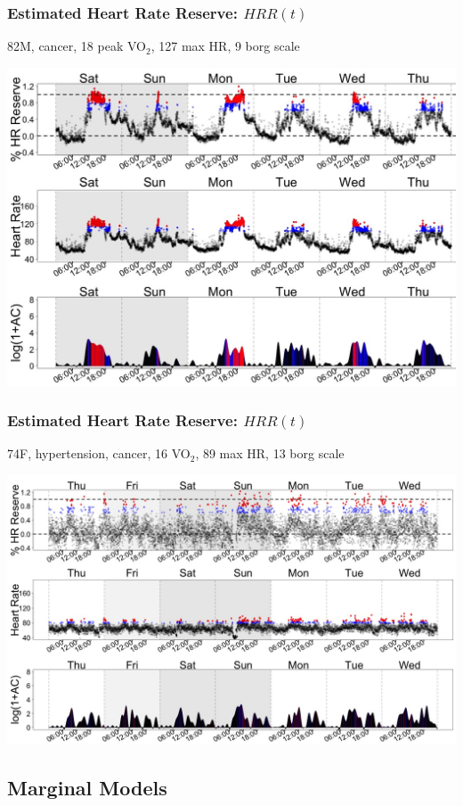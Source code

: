 \documentclass[10pt]{beamer}\usepackage[]{graphicx}\usepackage[]{color}
\begin{document}
\begin{frame}\frametitle{Estimated Heart Rate Reserve: $HRR(t)$}
82M, cancer, 18 peak VO$_2$, 127 max HR, 9 borg scale
\begin{center}
\includegraphics[width=\textwidth]{AC_HRR_HR_subj_4832}
\end{center}
\end{frame}

\begin{frame}\frametitle{Estimated Heart Rate Reserve: $HRR(t)$}
74F, hypertension,  cancer, 16 VO$_2$, 89 max HR, 13 borg scale
\begin{center}
\includegraphics[width=\textwidth]{AC_HRR_HR_subj_5614}
\end{center}
\end{frame}




\subsection{Marginal Models}
\end{document}
